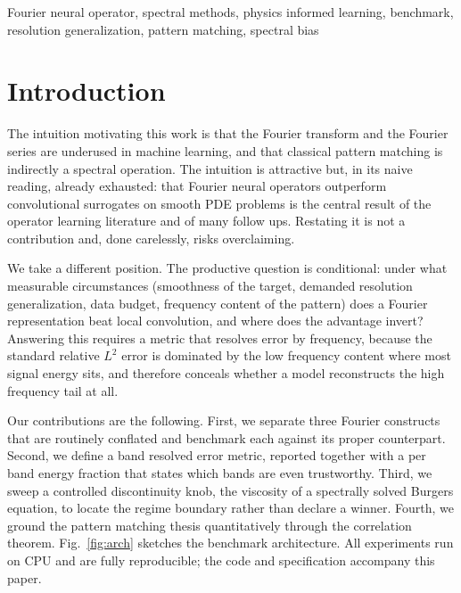 \documentclass[conference]{IEEEtran}
\begin{document}
\begin{IEEEkeywords}
Fourier neural operator, spectral methods, physics informed learning, benchmark, resolution generalization, pattern matching, spectral bias
\end{IEEEkeywords}

\section{Introduction}
The intuition motivating this work is that the Fourier transform and the Fourier series are underused in machine learning, and that classical pattern matching is indirectly a spectral operation. The intuition is attractive but, in its naive reading, already exhausted: that Fourier neural operators outperform convolutional surrogates on smooth PDE problems is the central result of the operator learning literature \cite{li2020fno} and of many follow ups. Restating it is not a contribution and, done carelessly, risks overclaiming.

We take a different position. The productive question is conditional: under what measurable circumstances (smoothness of the target, demanded resolution generalization, data budget, frequency content of the pattern) does a Fourier representation beat local convolution, and where does the advantage invert? Answering this requires a metric that resolves error by frequency, because the standard relative $L^2$ error is dominated by the low frequency content where most signal energy sits, and therefore conceals whether a model reconstructs the high frequency tail at all.

Our contributions are the following. First, we separate three Fourier constructs that are routinely conflated and benchmark each against its proper counterpart. Second, we define a band resolved error metric, reported together with a per band energy fraction that states which bands are even trustworthy. Third, we sweep a controlled discontinuity knob, the viscosity of a spectrally solved Burgers equation, to locate the regime boundary rather than declare a winner. Fourth, we ground the pattern matching thesis quantitatively through the correlation theorem. Fig.~\ref{fig:arch} sketches the benchmark architecture. All experiments run on CPU and are fully reproducible; the code and specification accompany this paper.
\end{document}
